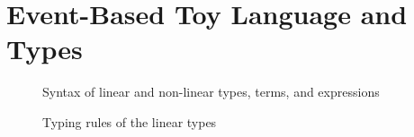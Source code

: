 \section{Event-Based Toy Language and Types}

\begin{figure}
    \centering
    
    \caption{Syntax of linear and non-linear types, terms, and expressions}
    \label{fig:syntax-of-types-terms-expressions}
\end{figure}

\begin{figure}
    \centering
    
    \caption{Typing rules of the linear types}
    \label{fig:typing-rules-for-linear-types}
\end{figure}